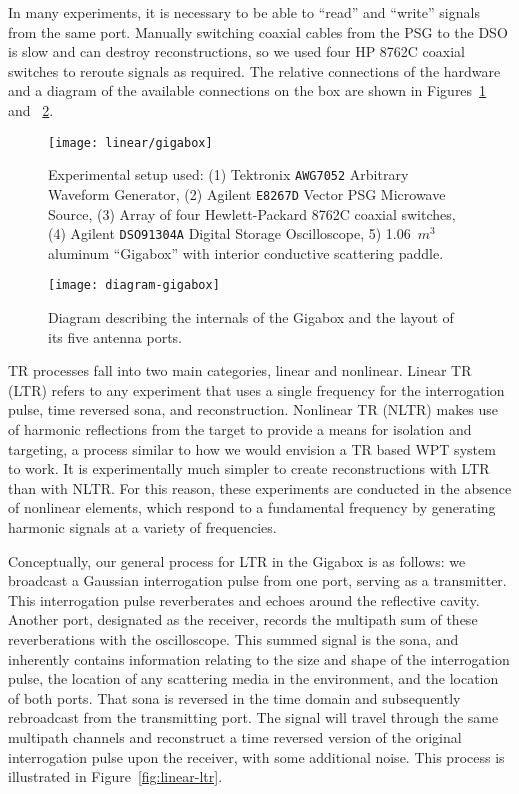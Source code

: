 In many experiments, it is necessary to be able to ``read'' and ``write'' signals from the same port. Manually switching coaxial cables from the PSG to the DSO is slow and can destroy reconstructions, so we used four HP 8762C coaxial switches to reroute signals as required. The relative connections of the hardware and a diagram of the available connections on the box are shown in Figures~\ref{fig:linear-gigabox} and ~\ref{fig:diagram-gigabox}.

\begin{figure}[h!]
\centering
\texttt{[image: linear/gigabox]}
    \caption[Experimental Setup]{Experimental setup used: (1) Tektronix \texttt{AWG7052} Arbitrary Waveform Generator, (2) Agilent \texttt{E8267D} Vector PSG Microwave Source, (3) Array of four Hewlett-Packard 8762C coaxial switches, (4) Agilent \texttt{DSO91304A} Digital Storage Oscilloscope, 5) 1.06~$m^3$ aluminum ``Gigabox'' with interior conductive scattering paddle.}
    \label{fig:linear-gigabox}
\end{figure}

\begin{figure}[h!]
\centering
\texttt{[image: diagram-gigabox]}
    \caption[Experimental Setup: Gigabox Detail]{Diagram describing the internals of the Gigabox and the layout of its five antenna ports.}
    \label{fig:diagram-gigabox}
\end{figure}

TR processes fall into two main categories, linear and nonlinear. Linear TR (LTR) refers to any experiment that uses a single frequency for the interrogation pulse, time reversed sona, and reconstruction. Nonlinear TR (NLTR) makes use of harmonic reflections from the target to provide a means for isolation and targeting, a process similar to how we would envision a TR based WPT system to work.  It is experimentally much simpler to create reconstructions with LTR than with NLTR. For this reason, these experiments are conducted in the absence of nonlinear elements, which respond to a fundamental frequency by generating harmonic signals at a variety of frequencies.

Conceptually, our general process for LTR in the Gigabox is as follows: we broadcast a Gaussian interrogation pulse from one port, serving as a transmitter. This interrogation pulse reverberates and echoes around the reflective cavity. Another port, designated as the receiver, records the multipath sum of these reverberations with the oscilloscope. This summed signal is the sona, and inherently contains information relating to the size and shape of the interrogation pulse, the location of any scattering media in the environment, and the location of both ports. That sona is reversed in the time domain and subsequently rebroadcast from the transmitting port. The signal will travel through the same multipath channels and reconstruct a time reversed version of the original interrogation pulse upon the receiver, with some additional noise. This process is illustrated in Figure~\ref{fig:linear-ltr}.

